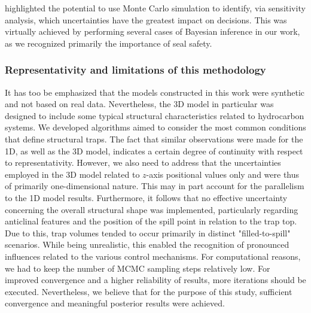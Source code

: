 	\citet{bratvold2010making} highlighted the potential to use Monte Carlo simulation to identify, via sensitivity analysis, which uncertainties have the greatest impact on decisions. This was virtually achieved by performing several cases of Bayesian inference in our work, as we recognized primarily the importance of seal safety.		
	\subsubsection{Representativity and limitations of this methodology}
	It has too be emphasized that the models constructed in this work were synthetic and not based on real data. Nevertheless, the 3D model in particular was designed to include some typical structural characteristics related to hydrocarbon systems. We developed algorithms aimed to consider the most common conditions that define structural traps. The fact that similar observations were made for the 1D, as well as the 3D model, indicates a certain degree of continuity with respect to representativity. However, we also need to address that the uncertainties employed in the 3D model related to $z$-axis positional values only and were thus of primarily one-dimensional nature. This may in part account for the parallelism to the 1D model results. Furthermore, it follows that no effective uncertainty concerning the overall structural shape was implemented, particularly regarding anticlinal features and the position of the spill point in relation to the trap top. Due to this, trap volumes tended to occur primarily in distinct "filled-to-spill" scenarios. While being unrealistic, this enabled the recognition of pronounced influences related to the various control mechanisms. For computational reasons, we had to keep the number of MCMC sampling steps relatively low. For improved convergence and a higher reliability of results, more iterations should be executed. Nevertheless, we believe that for the purpose of this study, sufficient convergence and meaningful posterior results were achieved.\\	
